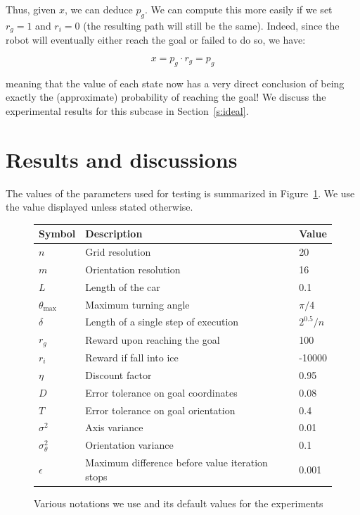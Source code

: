\documentclass[a4paper]{article}
\begin{document}
Thus, given $x$, we can deduce $p_g$. We can compute this more easily if we
set $r_g = 1$ and $r_i = 0$ (the resulting path will still be the same).
Indeed, since the robot will eventually either reach the goal or failed to
do so, we have:

$$x = p_g \cdot r_g = p_g$$

meaning that the value of each state now has a very direct conclusion of
being exactly the (approximate) probability of reaching the goal!
We discuss the experimental results for this subcase in Section~\ref{s:ideal}.

\section{Results and discussions}

The values of the parameters used for testing is summarized in Figure~\ref{f:notations}.
We use the value displayed unless stated otherwise.

\begin{figure}
\caption{Various notations we use and its default values for the experiments}
\label{f:notations}
\begin{tabular}{ l | l | l }
  Symbol & Description & Value \\ \hline \hline
  $n$ & Grid resolution & 20 \\ \hline
  $m$ & Orientation resolution & 16 \\ \hline
  $L$ & Length of the car & 0.1 \\ \hline
  $\theta_{\text{max}}$ & Maximum turning angle & $\pi / 4$ \\ \hline
  $\delta$ & Length of a single step of execution & $2^{0.5} / n$ \\ \hline
  $r_g$ & Reward upon reaching the goal & 100 \\ \hline
  $r_i$ & Reward if fall into ice & -10000 \\ \hline
  $\eta$ & Discount factor & 0.95 \\ \hline
  $D$ & Error tolerance on goal coordinates & 0.08 \\ \hline
  $T$ & Error tolerance on goal orientation & 0.4 \\ \hline
  $\sigma^2$ & Axis variance & 0.01 \\ \hline
  $\sigma_\theta^2$ & Orientation variance & 0.1 \\ \hline
  $\epsilon$ & Maximum difference before value iteration stops & 0.001 \\ \hline
\end{tabular}
\end{figure}
\end{document}

